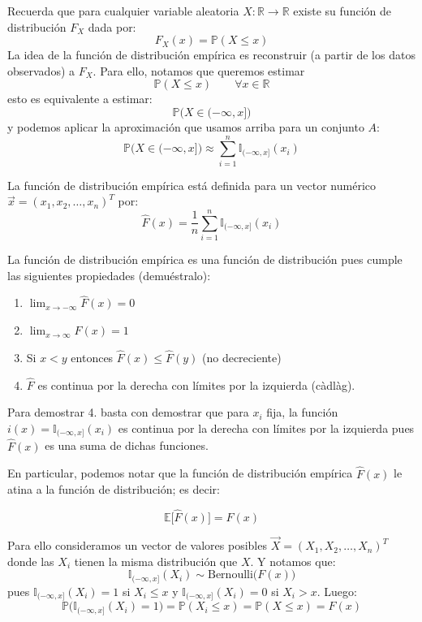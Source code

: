 \documentclass[
]{book}
\begin{document}
Recuerda que para cualquier variable aleatoria \(X:\mathbb{R}\to\mathbb{R}\) existe su función de distribución \(F_X\) dada por:
\[
F_X(x) = \mathbb{P}(X \leq x)
\]
La idea de la función de distribución empírica es reconstruir (a partir de los datos observados) a \(F_X\). Para ello, notamos que queremos estimar
\[
\mathbb{P}(X \leq x) \qquad \forall x\in\mathbb{R}
\]
esto es equivalente a estimar:
\[
\mathbb{P}\big(X \in (-\infty, x] \big)
\]
y podemos aplicar la aproximación que usamos arriba para un conjunto \(A\):
\[
\mathbb{P}\big(X \in (-\infty, x] \big) \approx \sum\limits_{i=1}^n \mathbb{I}_{(-\infty, x]}(x_i)
\]

La función de distribución empírica está definida para un vector numérico \(\vec{x} = (x_1, x_2, \dots, x_n)^T\) por:
\[
\hat{F} (x) = \frac{1}{n} \sum\limits_{i=1}^{n} \mathbb{I}_{(-\infty, x]}(x_i)
\]

La función de distribución empírica es una función de distribución pues cumple las siguientes propiedades (demuéstralo):

\begin{enumerate}
\def\labelenumi{\arabic{enumi}.}
\item
  \(\lim_{x \to -\infty} \hat{F}(x) = 0\)
\item
  \(\lim_{x \to \infty} \hat{F}(x) = 1\)
\item
  Si \(x < y\) entonces \(\hat{F}(x) \leq \hat{F}(y)\) (no decreciente)
\item
  \(\hat{F}\) es continua por la derecha con límites por la izquierda (càdlàg).
\end{enumerate}

Para demostrar 4. basta con demostrar que para \(x_i\) fija, la función \(i(x) = \mathbb{I}_{(-\infty, x]}(x_i)\) es continua por la derecha con límites por la izquierda pues \(\hat{F}(x)\) es una suma de dichas funciones.

En particular, podemos notar que la función de distribución empírica \(\hat{F} (x)\) le atina a la función de distribución; es decir:

\[
\mathbb{E}\big[\hat{F} (x) \big] = F(x) 
\]

Para ello consideramos un vector de valores posibles \(\vec{X} = (X_1, X_2, \dots, X_n)^T\) donde las \(X_i\) tienen la misma distribución que \(X\). Y notamos que:
\[
\mathbb{I}_{(-\infty, x]}(X_i) \sim \textrm{Bernoulli}\big(F(x)\big)
\]
pues \(\mathbb{I}_{(-\infty, x]}(X_i) = 1\) si \(X_i \leq x\) y \(\mathbb{I}_{(-\infty, x]}(X_i) = 0\) si \(X_i > x\). Luego:
\[
\mathbb{P}\Big( \mathbb{I}_{(-\infty, x]}(X_i) = 1 \Big) = \mathbb{P}(X_i \leq x) = \mathbb{P}(X\leq x) = F(x)
\]
\end{document}
